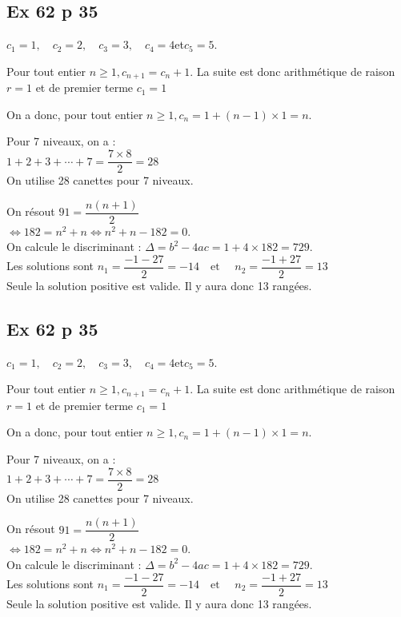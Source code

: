 \documentclass[a4paper,french]{book}
\begin{document}
\subsection*{Ex 62 p 35}
\begin{enumMet}
    \item $c_{1}=1,\quad c_{2}=2,\quad c_{3}=3,\quad c_{4}=4$\quad et\quad $c_{5}=5$.
    \item Pour tout entier $n \geqslant 1, c_{n+1}=c_{n}+1$. La suite est donc arithmétique de raison $r=1$ et de premier terme $c_{1}=1$
    \item On a donc, pour tout entier $n \geqslant 1, c_{n}=1+(n-1) \times 1=n$.
    \item Pour 7 niveaux, on a :\\
    $1+2+3+\cdots+7=\dfrac{7 \times 8}{2}=28$\\
    On utilise 28 canettes pour 7 niveaux.
    \item On résout $91=\dfrac{n(n+1)}{2}$\\
    $\Longleftrightarrow 182=n^{2}+n \Longleftrightarrow n^{2}+n-182=0 .$\\
    On calcule le discriminant : $\Delta=b^{2}-4 a c=1+4 \times 182=729$.\\
    Les solutions sont $n_{1}=\dfrac{-1-27}{2}=-14 \quad \text {et }\quad  n_{2}=\dfrac{-1+27}{2}=13$\\
    Seule la solution positive est valide. Il y aura donc 13 rangées.
\end{enumMet}

\subsection*{Ex 62 p 35}
\begin{enumMet}
    \item $c_{1}=1,\quad c_{2}=2,\quad c_{3}=3,\quad c_{4}=4$\quad et\quad $c_{5}=5$.
    \item Pour tout entier $n \geqslant 1, c_{n+1}=c_{n}+1$. La suite est donc arithmétique de raison $r=1$ et de premier terme $c_{1}=1$
    \item On a donc, pour tout entier $n \geqslant 1, c_{n}=1+(n-1) \times 1=n$.
    \item Pour 7 niveaux, on a :\\
    $1+2+3+\cdots+7=\dfrac{7 \times 8}{2}=28$\\
    On utilise 28 canettes pour 7 niveaux.
    \item On résout $91=\dfrac{n(n+1)}{2}$\\
    $\Longleftrightarrow 182=n^{2}+n \Longleftrightarrow n^{2}+n-182=0 .$\\
    On calcule le discriminant : $\Delta=b^{2}-4 a c=1+4 \times 182=729$.\\
    Les solutions sont $n_{1}=\dfrac{-1-27}{2}=-14 \quad \text {et }\quad  n_{2}=\dfrac{-1+27}{2}=13$\\
    Seule la solution positive est valide. Il y aura donc 13 rangées.
\end{enumMet}
\end{document}
